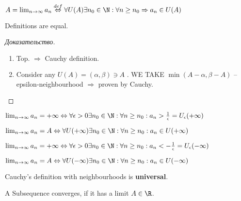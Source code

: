 \begin{definition}
	$A = \lim_{n \to \infty} a_n \overset{def} \Leftrightarrow \forall U(A) \exists n_0 \in \N: \forall n \geq n_0 \Rightarrow a_n \in U(A)$	
\end{definition}

\begin{lemma}
	Definitions are equal.
\end{lemma}

\begin{proof}[Доказательство]
	\begin{enumerate}
		\item Top. $ \Rightarrow $ Cauchy definition.
		\item Consider any $U(A) = \left( \alpha, \beta \right) \ni A$ . WE TAKE $\min (A - \alpha, \beta - A)$ -- epsilon-neighbourhood $ \Rightarrow $ proven by Cauchy.
	\end{enumerate}
\end{proof}

\begin{definition}
	$\lim_{n \to \infty} a_n = +\infty \Leftrightarrow \forall \epsilon > 0 \exists n_0 \in \N: \forall n \geq n_0: a_n > \frac{1}{\epsilon} = U_\epsilon (+\infty)$
\end{definition}


\begin{definition}[]
	$\lim_{n \to \infty} a_n = A \Leftrightarrow \forall U(+\infty) \exists n_0 \in \N: \forall n \geq n_0: a_n \in U(+\infty)$
\end{definition}

\begin{definition}
$\lim_{n \to \infty} a_n = +\infty \Leftrightarrow \forall \epsilon > 0 \exists n_0 \in \N: \forall n \geq n_0: a_n < -\frac{1}{\epsilon} = U_\epsilon (-\infty)$
\end{definition}


\begin{definition}[]
	$\lim_{n \to \infty} a_n = A \Leftrightarrow \forall U(-\infty) \exists n_0 \in \N: \forall n \geq n_0: a_n \in U(-\infty)$
\end{definition}

\begin{note}[]
	Cauchy's definition with neighbourhoods is \textbf{universal}.
\end{note}

A Subsequence converges, if it has a limit $A \in \R$.


